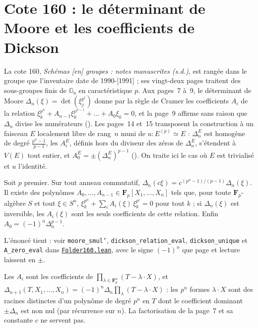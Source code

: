 \section[Cote 160 : le déterminant de Moore et les coefficients de Dickson]{Cote 160 : le déterminant de Moore et les coefficients de Dickson\protect{}}\label{sec:160}

La cote 160, \emph{Schémas [en] groupes : notes manuscrites (s.d.)}, est rangée dans le groupe  que l'inventaire date de 1990-[1991] ; ses vingt-deux pages traitent des sous-groupes finis de $\mathbb G_a$ en caractéristique $p$. Aux pages~7 à~9, le déterminant de Moore $\Delta_n(\xi) = \det(\xi_j^{p^i})$ donne par la règle de Cramer les coefficients $A_i$ de la relation $\xi_k^{p^n} + A_{n-1}\xi_k^{p^{n-1}} + \dots + A_0 \xi_k = 0$, et la page~9 affirme sans raison que $\Delta_n$ divise les numérateurs (). Les pages~14 et~15 transposent la construction à un faisceau $E$ localement libre de rang~$n$ muni de $u : E^{(p)} \simeq E$ : $\Delta_n^E$ est homogène de degré $\frac{p^n-1}{p-1}$, les $A_i^E$, définis hors du diviseur des zéros de $\Delta_n^E$, s'étendent à $V(E)$ tout entier, et $A_0^E = \pm(\Delta_n^E)^{p-1}$ (). On traite ici le cas où $E$ est trivialisé et $u$ l'identité.

\begin{encadre}
\begin{theoreme}
Soit $p$ premier. Sur tout anneau commutatif, $\Delta_n(c\xi) = c^{(p^n-1)/(p-1)}\Delta_n(\xi)$. Il existe des polynômes $A_0, \dots, A_{n-1} \in \mathbf F_p[X_1, \dots, X_n]$ tels que, pour toute $\mathbf F_p$-algèbre $S$ et tout $\xi \in S^n$, $\xi_k^{p^n} + \sum_i A_i(\xi)\, \xi_k^{p^i} = 0$ pour tout $k$ ; si $\Delta_n(\xi)$ est inversible, les $A_i(\xi)$ sont les seuls coefficients de cette relation. Enfin $A_0 = (-1)^n \Delta_n^{p-1}$.
\end{theoreme}
\end{encadre}

\noindent L'énoncé tient : voir \texttt{moore\_smul'}, \texttt{dickson\_relation\_eval}, \texttt{dickson\_unique} et \texttt{A\_zero\_eval} dans \href{\leanblob/RingTheory/Folder160.lean}{\texttt{Folder160.\allowbreak{}lean}}, avec le signe $(-1)^n$ que page et lecture laissent en $\pm$.

\begin{remarque}
Les $A_i$ sont les coefficients de $\prod_{\lambda \in \mathbf F_p^n}(T - \lambda \cdot X)$, et $\Delta_{n+1}(T, X_1, \dots, X_n) = (-1)^n \Delta_n \prod_\lambda (T - \lambda \cdot X)$ : les $p^n$ formes $\lambda \cdot X$ sont des racines distinctes d'un polynôme de degré $p^n$ en $T$ dont le coefficient dominant $\pm\Delta_n$ est non nul (par récurrence sur $n$). La factorisation de la page~7 et sa constante $c$ ne servent pas.
\end{remarque}

